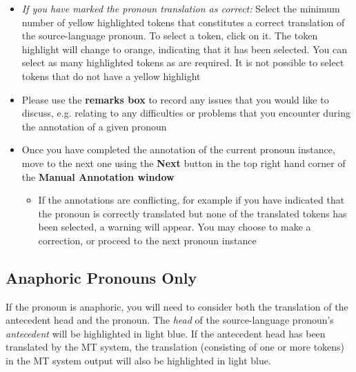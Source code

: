 \documentclass[11pt]{article} %
\begin{document}
\begin{itemize}
\begin{itemize}
    \item If the pronoun is present in the translation output but is not highlighted (i.e. a bad alignment), do not attempt to annotate the example. Instead, add a comment to the \textbf{remarks box}
    \item Note: if the pronoun is anaphoric, follow the guidelines in Section \ref{AnaphoricGuidelines}
  \end{itemize}
  \item \textit{If you have marked the pronoun translation as correct:} Select the minimum number of yellow highlighted tokens that constitutes a correct translation of the source-language pronoun. To select a token, click on it. The token highlight will change to orange, indicating that it has been selected. You can select as many highlighted tokens as are required. It is not possible to select tokens that do not have a yellow highlight
  \item Please use the \textbf{remarks box} to record any issues that you would like to discuss, e.g. relating to any difficulties or problems that you encounter during the annotation of a given pronoun
  \item Once you have completed the annotation of the current pronoun instance, move to the next one using the \textbf{Next} button in the top right hand corner of the \textbf{Manual Annotation window}
  \begin{itemize}
    \item If the annotations are conflicting, for example if you have indicated that the pronoun is correctly translated but none of the translated tokens has been selected, a warning will appear. You may choose to make a correction, or proceed to the next pronoun instance
  \end{itemize}
\end{itemize}


\subsection{Anaphoric Pronouns Only}
\label{AnaphoricGuidelines}

If the pronoun is anaphoric, you will need to consider both the translation of the antecedent head and the pronoun. The \textit{head} of the source-language pronoun's \textit{antecedent} will be highlighted in light blue. If the antecedent head has been translated by the MT system, the translation (consisting of one or more tokens) in the MT system output will also be highlighted in light blue.
\end{document}
